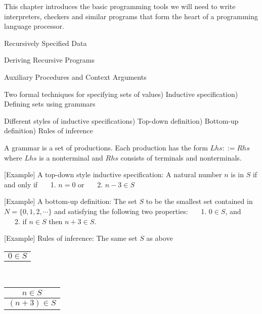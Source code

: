 \documentclass{article}
\begin{document}
\begin{huge}

\sf



This chapter introduces the basic programming tools we will need to write interpreters, checkers and similar programs that form the heart of a programming language processor. 

\blob Recursively Specified Data

\blob Deriving Recursive Programs

\blob Auxiliary Procedures and Context Arguments


Two formal techniques for specifying sets of values) Inductive specification) Defining sets using grammars

Different styles of inductive specifications) Top-down definition) Bottom-up definition) Rules of inference

A grammar is a set of productions. Each production has the form $Lhs ::= Rhs$ where $Lhs$ is a nonterminal and $Rhs$ consists of terminals and nonterminals. 


[Example] A top-down style inductive specification:\al\al
A natural number $n$ is in $S$ if and only if\al
\ \ \ 1. $n=0$ or\al
\ \ \ 2. $n-3 \in S$



[Example] A bottom-up definition:\al\al
The set $S$ to be the smallest set contained in $N=\{0,1,2,\cdots\}$ and satisfying the following two properties:\al\al
\ \ \ 1. $0 \in S$, and \al
\ \ \ 2. if $n \in S$ then $n + 3 \in S$. 

[Example] Rules of inference:\al\al
The same set $S$ as above \al\al
\begin{tabular}{c}
\phantom{or }\\ \hline
$0 \in S$
\end{tabular}
 \ \ \ 
\begin{tabular}{c}
$n \in S$ \\ \hline
$(n+3) \in S$
\end{tabular}


\end{huge}
\end{document}
